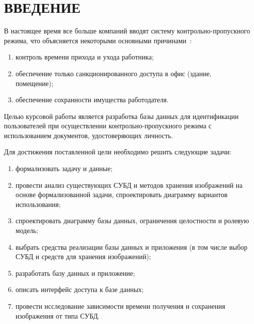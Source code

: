 \chapter*{ВВЕДЕНИЕ}

В настоящее время все больше компаний вводят систему контрольно-пропускного режима, что объясняется некоторыми основными причинами~\cite{introCPP}:
\begin{enumerate}
	\item контроль времени прихода и ухода работника;
	\item обеспечение только санкционированного доступа в офис (здание, помещение);
	\item обеспечение сохранности имущества работодателя.
\end{enumerate}

Целью курсовой работы является разработка базы данных для идентификации пользователей при осуществлении контрольно-пропускного режима с использованием документов, удостоверяющих личность.

Для достижения поставленной цели необходимо решить следующие задачи:
\begin{enumerate}
	\item формализовать задачу и данные;
	\item провести анализ существующих СУБД и методов хранения изображений на основе
	формализованной задачи, спроектировать диаграмму вариантов использования;
	\item спроектировать диаграмму базы данных, ограничения целостности и ролевую модель;
	\item выбрать средства реализации базы данных и приложения (в том числе выбор СУБД и средств для хранения изображений);
	\item разработать базу данных и приложение;
	\item описать интерфейс доступа к базе данных;
	\item провести исследование зависимости времени получения и сохранения изображения от типа СУБД.
\end{enumerate}